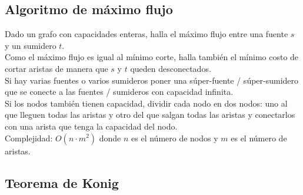 \documentclass[10pt,letterpaper,twocolumn]{article}
\newcommand{\source}[1]{
  
  \dotfill
}
\begin{document}
  \subsection{Algoritmo de máximo flujo}
    Dado un grafo con capacidades enteras, halla el máximo flujo entre una fuente $s$ y un sumidero $t$.\\
    Como el máximo flujo es igual al mínimo corte, halla también el mínimo costo de cortar aristas de manera que $s$ y $t$ queden desconectados.\\
    Si hay varias fuentes o varios sumideros poner una súper-fuente / súper-sumidero que se conecte a las fuentes / sumideros con capacidad infinita.\\
    Si los nodos también tienen capacidad, dividir cada nodo en dos nodos: uno al que lleguen todas las aristas y otro del que salgan todas las aristas y conectarlos con una arista que tenga la capacidad del nodo.\\
    Complejidad: $O(n \cdot m^2)$ donde $n$ es el número de nodos y $m$ es el número de aristas.\\
    \source{./src/maxflow.cpp}
  \subsection{Teorema de Konig}
\end{document}
